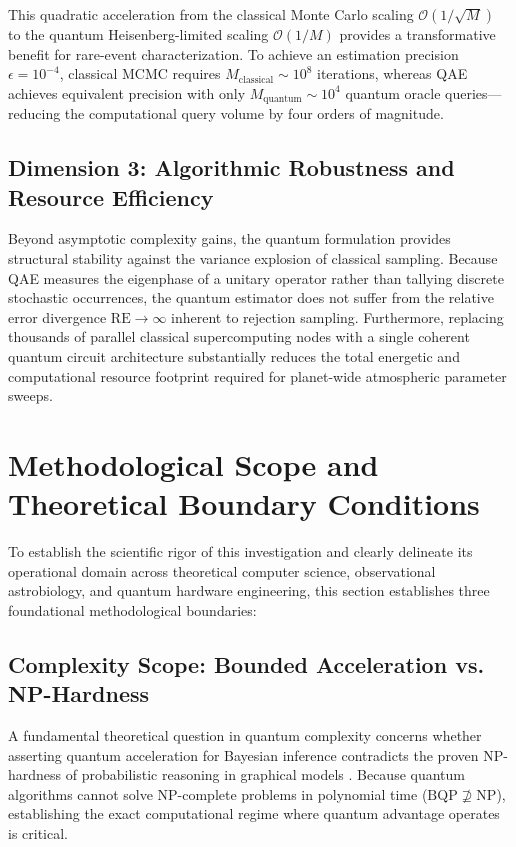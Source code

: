 This quadratic acceleration from the classical Monte Carlo scaling $\mathcal{O}(1/\sqrt{M})$ to the quantum Heisenberg-limited scaling $\mathcal{O}(1/M)$ provides a transformative benefit for rare-event characterization. To achieve an estimation precision $\epsilon = 10^{-4}$, classical MCMC requires $M_{\mathrm{classical}} \sim 10^8$ iterations, whereas QAE achieves equivalent precision with only $M_{\mathrm{quantum}} \sim 10^4$ quantum oracle queries---reducing the computational query volume by four orders of magnitude.

\subsection{Dimension 3: Algorithmic Robustness and Resource Efficiency}
Beyond asymptotic complexity gains, the quantum formulation provides structural stability against the variance explosion of classical sampling. Because QAE measures the eigenphase of a unitary operator rather than tallying discrete stochastic occurrences, the quantum estimator does not suffer from the relative error divergence $\mathrm{RE} \to \infty$ inherent to rejection sampling. Furthermore, replacing thousands of parallel classical supercomputing nodes with a single coherent quantum circuit architecture substantially reduces the total energetic and computational resource footprint required for planet-wide atmospheric parameter sweeps.

\section{Methodological Scope and Theoretical Boundary Conditions}\label{sec:methodological_scope}

To establish the scientific rigor of this investigation and clearly delineate its operational domain across theoretical computer science, observational astrobiology, and quantum hardware engineering, this section establishes three foundational methodological boundaries:

\subsection{Complexity Scope: Bounded Acceleration vs. NP-Hardness}
A fundamental theoretical question in quantum complexity concerns whether asserting quantum acceleration for Bayesian inference contradicts the proven NP-hardness of probabilistic reasoning in graphical models \cite{cooper1990, dagum1993}. Because quantum algorithms cannot solve NP-complete problems in polynomial time ($\mathrm{BQP} \not\supseteq \mathrm{NP}$), establishing the exact computational regime where quantum advantage operates is critical.

